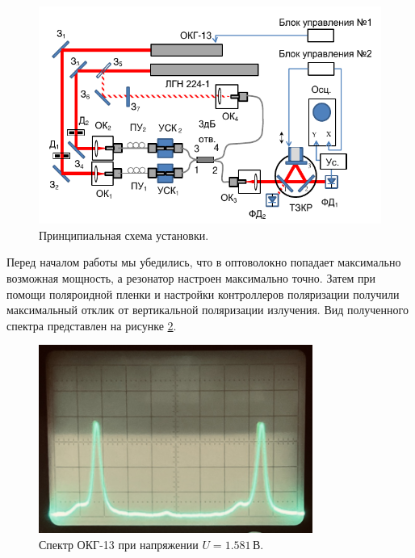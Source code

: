 \documentclass[12pt, russian, a4paper]{article}
\begin{document}
	\begin{figure}[htbp]
		\centering
		\includegraphics[width=\textwidth]{../images/scheme.png}
		\caption{Принципиальная схема установки.}
		\label{fig:scheme}
	\end{figure}



	Перед началом работы мы убедились, что в оптоволокно попадает максимально возможная мощность, а резонатор настроен максимально точно. Затем при помощи поляроидной пленки и настройки контроллеров поляризации получили максимальный отклик от вертикальной поляризации излучения. Вид полученного спектра представлен на рисунке \ref{fig:1}.

	\begin{figure}[htbp]
		\centering
		\includegraphics[width=0.8\textwidth]{../images/1.PNG}
		\caption{Спектр ОКГ-13 при напряжении $U=1.581\,\text{В}$.}
		\label{fig:1}
	\end{figure}
\end{document}
